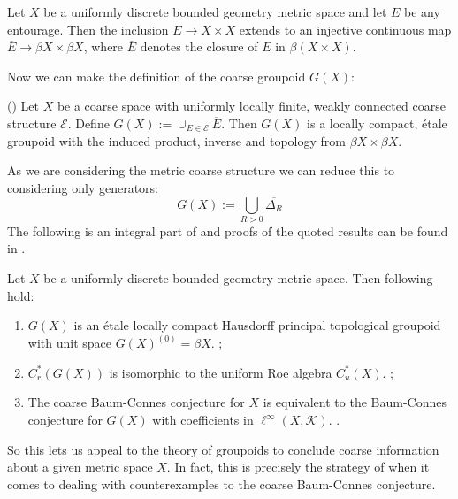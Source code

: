 \begin{conjecture}
{\begin{lemma}\label{Lem:CorRoe}
Let $X$ be a uniformly discrete bounded geometry metric space and let $E$ be any entourage. Then the inclusion $E \rightarrow X \times X$ extends to an injective continuous map $\overline{E} \rightarrow \beta X \times \beta X$, where $\overline{E}$ denotes the closure of $E$ in $\beta(X \times X)$.
\end{lemma}
Now we can make the definition of the coarse groupoid $G(X)$:
\begin{theorem}(\cite[Theorem 10.20]{MR2007488})
Let $X$ be a coarse space with uniformly locally finite, weakly connected coarse structure $\mathcal{E}$. Define $G(X):=\cup_{E\in \mathcal{E}}\overline{E}.$ Then $G(X)$ is a locally compact, \'etale groupoid with the induced product, inverse and topology from $\beta X \times \beta X$.
\end{theorem}
As we are considering the metric coarse structure we can reduce this to considering only generators:
\begin{equation*}
G(X):=\bigcup_{R>0}\overline{\Delta_{R}}
\end{equation*}
The following is an integral part of \cite{MR1905840} and proofs of the quoted results can be found in \cite{MR2007488}.
\begin{theorem}
Let $X$ be a uniformly discrete bounded geometry metric space. Then following hold:
\begin{enumerate}
\item $G(X)$ is an \'etale locally compact Hausdorff principal topological groupoid with unit space $G(X)^{(0)}=\beta X$. \cite[Theorem 10.20]{MR2007488}\cite[Proposition 3.2]{MR1905840};
\item $C^{*}_{r}(G(X))$ is isomorphic to the uniform Roe algebra $C^{*}_{u}(X)$. \cite[Proposition 10.29]{MR2007488};
\item The coarse Baum-Connes conjecture for $X$ is equivalent to the Baum-Connes conjecture for $G(X)$ with coefficients in $\ell^{\infty}(X,\mathcal{K})$. \cite[Lemma 4.7]{MR1905840}.
\end{enumerate}
\end{theorem}

So this lets us appeal to the theory of groupoids to conclude coarse information about a given metric space $X$. In fact, this is precisely the strategy of \cite{MR1911663} when it comes to dealing with counterexamples to the coarse Baum-Connes conjecture.

}
\end{conjecture}
